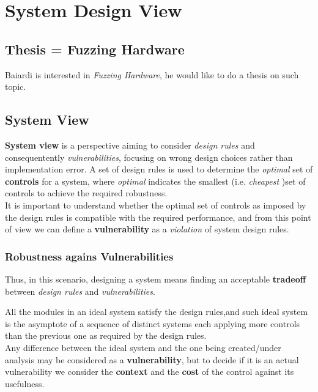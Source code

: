\chapter{System Design View}


\section{Thesis = Fuzzing Hardware}
Baiardi is interested in \textit{Fuzzing Hardware},
he would like to do a thesis on such topic.

\section{System View}
\textbf{System view} is a perspective aiming to consider \textit{design rules} and consequentently \textit{vulnerabilities},
focusing on wrong design choices rather than
implementation error.
A set of design rules is used to determine the \textit{optimal} set of \textbf{controls} for a system, where \textit{optimal} indicates the smallest (i.e. \textit{cheapest} \smiley)set of controls to achieve the required robustness.\\
It is important to understand whether the optimal set of controls as imposed
by the design rules is compatible with the required performance,
and from this point of view we can define a \textbf{vulnerability} as a \textit{violation} of system design rules.

\subsection{Robustness agains Vulnerabilities}
Thus, in this scenario, designing a system means finding an acceptable \textbf{tradeoff} between \textit{design rules} and \textit{vulnerabilities}.

All the modules in an ideal system satisfy the design rules,and such ideal system is the asymptote of a sequence of distinct systems each applying more controls than the previous one as required by the design rules.\\
Any difference between the ideal system and the one being
created/under analysis may be considered as a \textbf{vulnerability},
but to decide if it is an actual vulnerability we consider the \textbf{context}
and the \textbf{cost} of the control against its usefulness.
\nl

